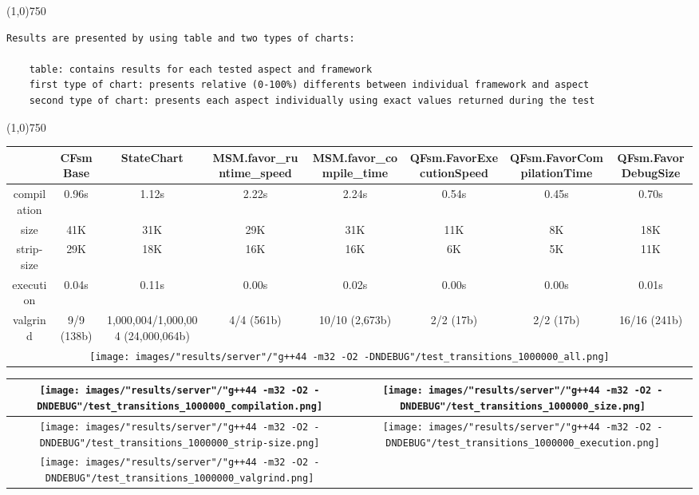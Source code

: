 \begin{center}
\line(1,0){750}
\end{center}
\begin{verbatim}
Results are presented by using table and two types of charts:

    table: contains results for each tested aspect and framework
    first type of chart: presents relative (0-100%) differents between individual framework and aspect
    second type of chart: presents each aspect individually using exact values returned during the test
\end{verbatim}
\begin{center}
\line(1,0){750}
\end{center}
\begin{landscape}
\begin{table}
\caption{"server" [54c084f], g++44 -m32 -O2 -DNDEBUG/test transitions 1000000}
\centering
\begin{longtable}{| c | c |c |c |c |c |c |c |}
\hline
& CFsmBase& StateChart& MSM.favor\_runtime\_speed& MSM.favor\_compile\_time& QFsm.FavorExecutionSpeed& QFsm.FavorCompilationTime& QFsm.FavorDebugSize\\
\hline
compilation & 0.96s & 1.12s & 2.22s & 2.24s & 0.54s & 0.45s & 0.70s\\
\hline
size & 41K & 31K & 29K & 31K & 11K & 8K & 18K\\
\hline
strip-size & 29K & 18K & 16K & 16K & 6K & 5K & 11K\\
\hline
execution & 0.04s & 0.11s & 0.00s & 0.02s & 0.00s & 0.00s & 0.01s\\
\hline
valgrind & 9/9 (138b) & 1,000,004/1,000,004 (24,000,064b) & 4/4 (561b) & 10/10 (2,673b) & 2/2 (17b) & 2/2 (17b) & 16/16 (241b)\\
\hline
\multicolumn{8}{|c|}{\texttt{[image: images/"results/server"/"g++44 -m32 -O2 -DNDEBUG"/test\_transitions\_1000000\_all.png]}}\\
\hline
\end{longtable}
\end{table}
\end{landscape}
\newpage
\begin{table}
\centering
\begin{longtable}{| c | c |}
\hline
\texttt{[image: images/"results/server"/"g++44 -m32 -O2 -DNDEBUG"/test\_transitions\_1000000\_compilation.png]}& \texttt{[image: images/"results/server"/"g++44 -m32 -O2 -DNDEBUG"/test\_transitions\_1000000\_size.png]}\\
\hline
\texttt{[image: images/"results/server"/"g++44 -m32 -O2 -DNDEBUG"/test\_transitions\_1000000\_strip-size.png]}& \texttt{[image: images/"results/server"/"g++44 -m32 -O2 -DNDEBUG"/test\_transitions\_1000000\_execution.png]}\\
\hline
\texttt{[image: images/"results/server"/"g++44 -m32 -O2 -DNDEBUG"/test\_transitions\_1000000\_valgrind.png]}& \\ \hline
\end{longtable}
\end{table}

